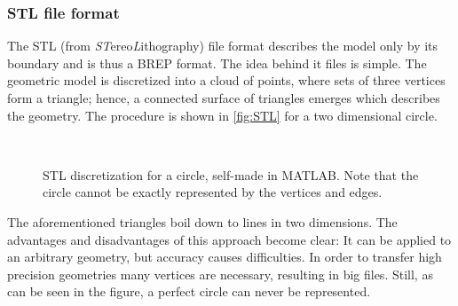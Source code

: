 \subsubsection{STL file format} \label{subsub:STL}
The STL (from \emph{ST}ereo\emph{L}ithography) file format describes the model only by its boundary and is thus a BREP format. The idea behind it files is simple. The geometric model is discretized into a cloud of points, where sets of three vertices form a triangle; hence, a connected surface of triangles emerges which describes the geometry. The procedure is shown in \autoref{fig:STL} for a two dimensional circle.  
\begin{figure}
\centering
   \\
   \caption{STL discretization for a circle, self-made in MATLAB. Note that the circle cannot be exactly represented by the vertices and edges.}
   \label{fig:STL}
\end{figure}
The aforementioned triangles boil down to lines in two dimensions. The advantages and disadvantages of this approach become clear: It can be applied to an arbitrary geometry, but accuracy causes difficulties. In order to transfer high precision geometries many vertices are necessary, resulting in big files. Still, as can be seen in the figure, a perfect circle can never be represented. 

